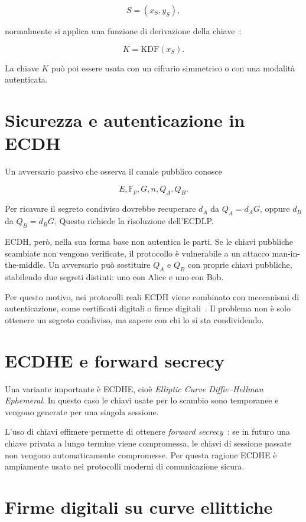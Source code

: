 \documentclass[12pt,a4paper,oneside]{report}
\begin{document}
\[
S=(x_S,y_S),
\]

normalmente si applica una funzione di derivazione della chiave~\cite{sec1}:

\[
K=\mathrm{KDF}(x_S).
\]

La chiave \(K\) può poi essere usata con un cifrario simmetrico o con una modalità autenticata.

\section{Sicurezza e autenticazione in ECDH}

Un avversario passivo che osserva il canale pubblico conosce

\[
E,\mathbb{F}_p,G,n,Q_A,Q_B.
\]

Per ricavare il segreto condiviso dovrebbe recuperare \(d_A\) da \(Q_A=d_A G\), oppure \(d_B\) da \(Q_B=d_B G\). Questo richiede la risoluzione dell'ECDLP.

ECDH, però, nella sua forma base non autentica le parti. Se le chiavi pubbliche scambiate non vengono verificate, il protocollo è vulnerabile a un attacco man-in-the-middle. Un avversario può sostituire \(Q_A\) e \(Q_B\) con proprie chiavi pubbliche, stabilendo due segreti distinti: uno con Alice e uno con Bob.

Per questo motivo, nei protocolli reali ECDH viene combinato con meccanismi di autenticazione, come certificati digitali o firme digitali~\cite{margara_dh,margara_ssl}. Il problema non è solo ottenere un segreto condiviso, ma sapere con chi lo si sta condividendo.

\section{ECDHE e forward secrecy}

Una variante importante è ECDHE, cioè \textit{Elliptic Curve Diffie--Hellman Ephemeral}. In questo caso le chiavi usate per lo scambio sono temporanee e vengono generate per una singola sessione.

L'uso di chiavi effimere permette di ottenere \textit{forward secrecy}~\cite{margara_ssl,sec1}: se in futuro una chiave privata a lungo termine viene compromessa, le chiavi di sessione passate non vengono automaticamente compromesse. Per questa ragione ECDHE è ampiamente usato nei protocolli moderni di comunicazione sicura.

\section{Firme digitali su curve ellittiche}
\end{document}
